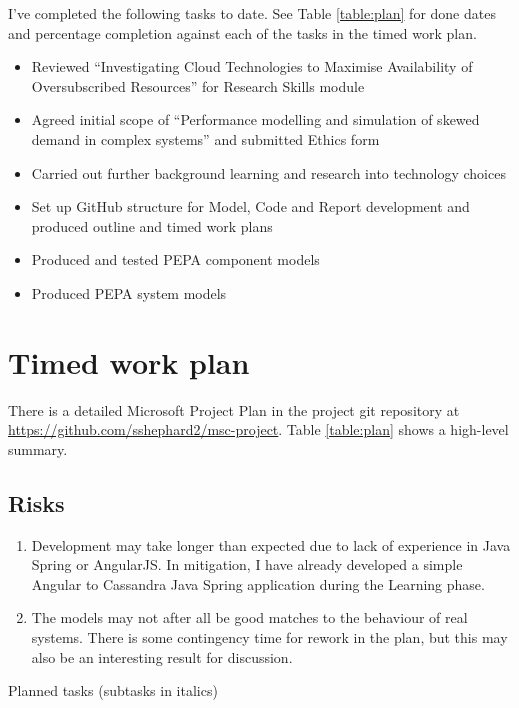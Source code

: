 \documentclass[runningheads]{llncs}
\begin{document}
I've completed the following tasks to date. See Table \ref{table:plan} for done dates and percentage completion against each of the tasks in the timed work plan.
\begin{itemize}
	\item Reviewed ``Investigating Cloud Technologies to Maximise Availability of Oversubscribed Resources'' for Research Skills module
	\item Agreed initial scope of ``Performance modelling and simulation of skewed demand in complex systems'' and submitted Ethics form
	\item Carried out further background learning and research into technology choices
	\item Set up GitHub structure for Model, Code and Report development and produced outline and timed work plans
	\item Produced and tested PEPA component models
	\item Produced PEPA system models
\end{itemize}

%
%

\section{Timed work plan}

There is a detailed Microsoft Project Plan in the project git repository at \url{https://github.com/sshephard2/msc-project}.  Table \ref{table:plan} shows a high-level summary.

\subsection{Risks}
\begin{enumerate}
	\item Development may take longer than expected due to lack of experience in Java Spring or AngularJS.  In mitigation, I have already developed a simple Angular to Cassandra Java Spring application during the Learning phase.
	\item The models may not after all be good matches to the behaviour of real systems.  There is some contingency time for rework in the plan, but this may also be an interesting result for discussion.
\end{enumerate}

\begin{table}[h!]
	\begin{center}
		\caption{Planned tasks (subtasks in italics)}
		\label{table:plan}
	\end{center}
\end{table}


%
%

\newpage



\end{document}
